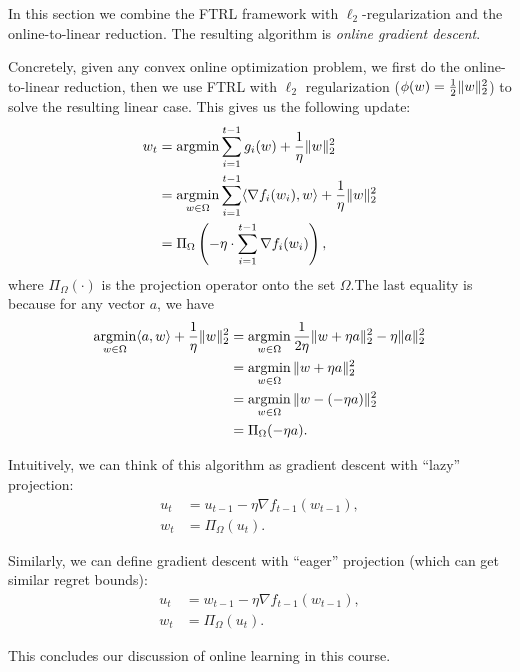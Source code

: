 In this section we combine the FTRL framework with $\ell_2$-regularization and the online-to-linear reduction. The resulting algorithm is \textit{online gradient descent}.

Concretely, given any convex online optimization problem, we first do the online-to-linear reduction, then we use FTRL with $\ell_2$ regularization ($\phi (w) = \frac{1}{2}\|w\|_2^2$) to solve the resulting linear case. This gives us the following update:
\begin{align}
w_t &= \operatorname*{\textup{argmin}} \sum_{i=1}^{t-1} g_i(w) + \frac{1}{\eta} \|w\|_2^2 \\
&= \operatorname*{\textup{argmin}}_{w \in \Omega} \sum_{i=1}^{t-1} \langle \nabla f_i(w_i), w \rangle + \frac{1}{\eta} \|w\|_2^2 \\
&= \Pi_\Omega \left( -\eta \cdot \sum_{i=1}^{t-1} \nabla f_i(w_i) \right),
\end{align}
where $\Pi_\Omega (\cdot)$ is the projection operator onto the set $\Omega$.The last equality is because for any vector $a$, we have 
\begin{align}
\operatorname*{\textup{argmin}}_{w \in \Omega} \langle a, w\rangle + \frac{1}{\eta} \|w\|_2^2 & = \operatorname*{\textup{argmin}}_{w \in \Omega} \frac{1}{2\eta} \|w + \eta a\|_2^2 - \eta \|a\|_2^2 \\
& = \operatorname*{\textup{argmin}}_{w \in \Omega} \|w + \eta a\|_2^2 \\
& = \operatorname*{\textup{argmin}}_{w \in \Omega} \|w - (-\eta a)\|_2^2 \\
& = \Pi_\Omega(-\eta a).
\end{align}

Intuitively, we can think of this algorithm as gradient descent with ``lazy'' projection:
\begin{align}
u_t &= u_{t-1} - \eta \nabla f_{t-1}(w_{t-1}), \\
w_t &= \Pi_\Omega(u_t).
\end{align}

Similarly, we can define gradient descent with ``eager'' projection (which can get similar regret bounds):
\begin{align}
u_t &= w_{t-1} - \eta \nabla f_{t-1}(w_{t-1}), \\
w_t &= \Pi_\Omega(u_t).
\end{align}

This concludes our discussion of online learning in this course.

